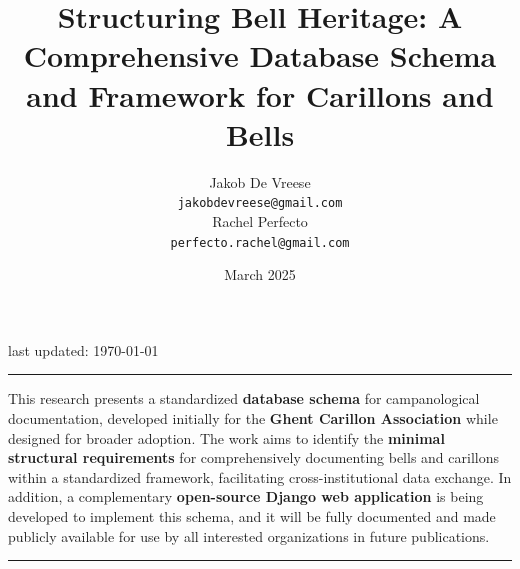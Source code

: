 \documentclass[11pt, a4paper]{article}
\title{\Huge Structuring Bell Heritage: A Comprehensive Database Schema and Framework for Carillons and Bells}
\author{\LARGE{Jakob De Vreese} \\ 
\texttt{\small{jakobdevreese@gmail.com}} \\
\LARGE{Rachel Perfecto} \\
\texttt{\small{perfecto.rachel@gmail.com}}}
\date{March 2025}
\newlength{\abstractwidth}
\begin{document}
\begin{titlepage}
    \maketitle
    \thispagestyle{empty}
    \vspace{1cm}
    \begin{center}
        \small{last updated: \today}
    \end{center}
    \vspace{2cm}
    
    \begin{center}
        \rule{\textwidth}{0.4pt}
        \vspace{1em}
        
        \begin{minipage}{\abstractwidth}
            \setlength{\rightskip}{0pt plus 1fil} %
            \justifying
            \noindent
            This research presents a standardized \textbf{database schema} for campanological documentation, developed initially for the \textbf{Ghent Carillon Association} while designed for broader adoption. The work aims to identify the \textbf{minimal structural requirements} for comprehensively documenting bells and carillons within a standardized framework, facilitating cross-institutional data exchange. In addition, a complementary \textbf{open-source Django web application} is being developed to implement this schema, and it will be fully documented and made publicly available for use by all interested organizations in future publications.
          \end{minipage}
        
        \vspace{1em}
        \rule{\textwidth}{0.4pt}
    \end{center}

    \restoregeometry
\end{titlepage}


\clearpage
\setcounter{page}{1}
\tableofcontents
\clearpage

\end{document}
